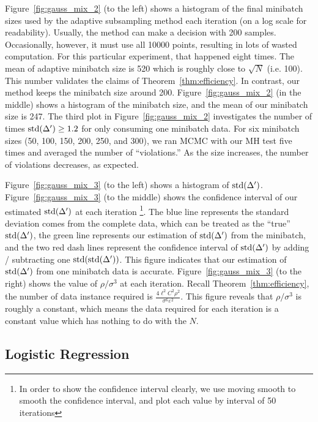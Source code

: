 \documentclass{article}
\begin{document}
Figure~\ref{fig:gauss_mix_2} (to the left) shows a histogram of the final minibatch sizes used by
the adaptive subsampling method each iteration (on a log scale for readability).  Usually, the method
can make a decision with 200 samples. Occasionally, however, it must use all 10000 points, resulting
in lots of wasted computation.  For this particular experiment, that happened eight times. The mean of adaptive minibatch size is 520 which is roughly close to $\sqrt{N}$ (i.e. 100). This number validates the claims of Theorem~\ref{thm:efficiency}. In
contrast, our method keeps the minibatch size around 200. Figure~\ref{fig:gauss_mix_2} (in the middle) shows a histogram of the minibatch size, and the mean of our minibatch size is 247. 
The third plot in Figure~\ref{fig:gauss_mix_2} investigates the number of times ${\rm std}(\Delta')
\ge 1.2$ for only consuming one minibatch data. For six minibatch sizes (50, 100, 150, 200, 250, and 300), we ran MCMC with
our MH test five times and averaged the number of ``violations.'' As the size increases, the
number of violations decreases, as expected.

Figure~\ref{fig:gauss_mix_3} (to the left) shows a histogram of ${\rm std}(\Delta')$. Figure~\ref{fig:gauss_mix_3} (to the middle) shows the confidence interval of our estimated ${\rm std}(\Delta')$ at each iteration \footnote{In order to show the confidence interval clearly, we use moving smooth to smooth the confidence interval, and plot each value by interval of 50 iterations}. The blue line represents the standard deviation comes from the complete data, which can be treated as the ``true'' ${\rm std}(\Delta')$, the green line represents our estimation of ${\rm std}(\Delta')$ from the minibatch, and the two red dash lines represent the confidence interval of ${\rm std}(\Delta')$ by adding / subtracting one ${\rm std(std(}\Delta'))$. This figure indicates that our estimation of ${\rm std}(\Delta')$ from one minibatch data is accurate. Figure~\ref{fig:gauss_mix_3} (to the right) shows the value of $\rho/\sigma^3$ at each iteration. Recall Theorem~\ref{thm:efficiency}, the number of data instance required is $\frac{4 \ell^2 C^2 \rho^2 }{\sigma^6 \varepsilon^2}$. This figure reveals that $\rho/\sigma^3$ is roughly a constant, which means the data required for each iteration is a constant value which has nothing to do with the $N$.


\subsection{Logistic Regression}\label{ssec:logistic}
\end{document}
